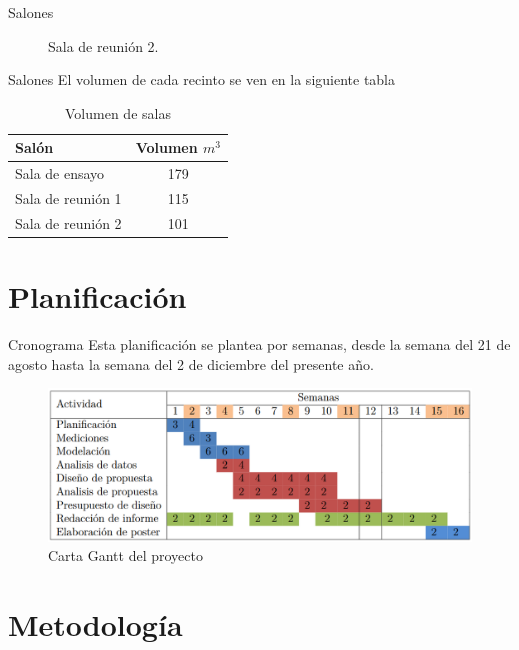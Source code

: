 \documentclass{sintefbeamer}
\begin{document}
\begin{frame}{Salones}
\begin{figure}[!htb]
  \caption{Sala de reunión 2.}\label{fig:sala-reunion2}
\endminipage
\end{figure}
\end{frame}
\begin{frame}{Salones}
El volumen de cada recinto se ven en la siguiente tabla
    \begin{table}[H]
        \centering
        \begin{tabular}{|l|c|}
        \hline
         \textbf{Salón} & \textbf{Volumen $m^3$} \\ \hline
         Sala de ensayo & 179 \\ \hline
         Sala de reunión 1 & 115 \\ \hline
         Sala de reunión 2 & 101 \\ \hline
        \end{tabular}
        \caption{Volumen de salas}
        \label{tab:volumne de salas}
    \end{table}
\end{frame}
\section{Planificación}

\begin{frame}{Cronograma}
Esta planificación se plantea por semanas, desde la semana del 21 de agosto hasta la semana del 2 de diciembre del presente año. 
\begin{figure}
    \centering
    \includegraphics[width=\textwidth]{images/CartaGantt}
    \caption{Carta Gantt del proyecto}
    \label{fig:carta gantt}
\end{figure}

\end{frame}

\section{Metodología}
\end{document}
